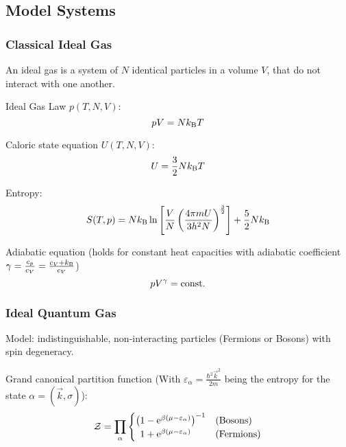 	\subsection{Model Systems}
		\subsubsection{Classical Ideal Gas}
			\noindent
			An ideal gas is a system of $N$ identical particles in a volume $V$, that do not interact with one another.\vsp

			\noindent
			Ideal Gas Law $p(T, N, V)$:
			\begin{equation}
				pV = N k_{\text{B}} T
			\end{equation}

			\noindent
			Caloric state equation $U(T, N, V)$:
			\begin{equation}
				U = \frac{3}{2} N k_{\text{B}} T
			\end{equation}

			\noindent
			Entropy:
			\begin{equation}
				S(T,p) = N k_{\text{B}} \ln{\left[ \frac{V}{N}\left( \frac{4\pi m	U}{3 h^2 N} \right)^{\frac{3}{2}} \right]} + \frac{5}{2} N k_{\text{B}}
			\end{equation}

			\noindent
			Adiabatic equation (holds for constant heat capacities with adiabatic coefficient $\gamma = \frac{c_p}{c_V} = \frac{c_V + k_{\text{B}}}{c_V}$)
			\begin{equation}
				p V^\gamma = \mathrm{const.}
			\end{equation}

		\subsubsection{Ideal Quantum Gas}
			\noindent
			Model: indistinguishable, non-interacting particles (Fermions or Bosons) with spin degeneracy. \vsp

			\noindent
			Grand canonical partition function (With $\varepsilon_\alpha = \frac{\hbar^2 \vec{k}^2}{2m}$ being the entropy for the state $\alpha=(\vec{k},\sigma)$):
			\begin{equation}
				\mathcal{Z} = \prod_{\alpha}
				\begin{cases}
					\left( 1-\mathrm{e}^{\beta(\mu-\varepsilon_\alpha)}\right)^{-1} & \text{(Bosons)} \\
					\phantom{\big(} 1+\mathrm{e}^{\beta(\mu-\varepsilon_\alpha)} & \text{(Fermions)}
				\end{cases}
			\end{equation}

